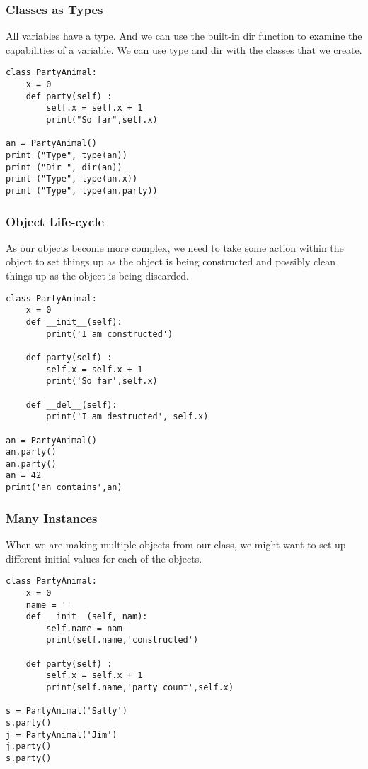 \begin{frame}[fragile]\frametitle{Classes as Types}
All variables have a type. And we can use the built-in
dir function to examine the capabilities of a variable. We can use type and dir
with the classes that we create.
\begin{lstlisting}
class PartyAnimal:
	x = 0
	def party(self) :
		self.x = self.x + 1
		print("So far",self.x)

an = PartyAnimal()
print ("Type", type(an))
print ("Dir ", dir(an))
print ("Type", type(an.x))
print ("Type", type(an.party))
\end{lstlisting}
\end{frame}

\begin{frame}[fragile]\frametitle{Object Life-cycle}
As our objects become more complex, we need to take some action within the object to set things up as
the object is being constructed and possibly clean things up as the object is being
discarded.
\begin{lstlisting}
class PartyAnimal:
	x = 0
	def __init__(self):
		print('I am constructed')
	
	def party(self) :
		self.x = self.x + 1
		print('So far',self.x)

	def __del__(self):
		print('I am destructed', self.x)

an = PartyAnimal()
an.party()
an.party()
an = 42
print('an contains',an)
\end{lstlisting}
\end{frame}

\begin{frame}[fragile]\frametitle{Many Instances}
When we are making multiple objects from our class, we might want to set up different initial values for each of the objects.
\begin{lstlisting}
class PartyAnimal:
	x = 0
	name = ''
	def __init__(self, nam):
		self.name = nam
		print(self.name,'constructed')

	def party(self) :
		self.x = self.x + 1
		print(self.name,'party count',self.x)

s = PartyAnimal('Sally')
s.party()
j = PartyAnimal('Jim')
j.party()
s.party()
\end{lstlisting}
\end{frame}

